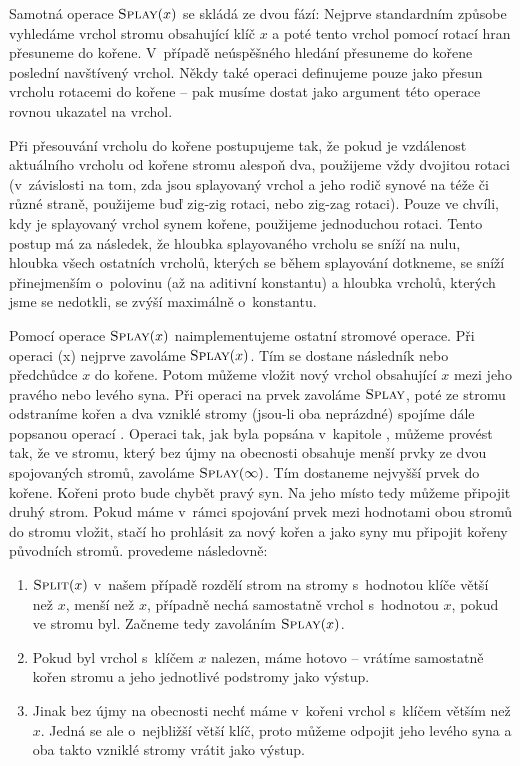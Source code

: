 Samotná operace $\ope{Splay}(x)$ se skládá ze dvou fází: Nejprve standardním způsobe
vyhledáme vrchol stromu obsahující klíč $x$ a poté tento vrchol pomocí rotací
hran přesuneme do kořene. V~případě neúspěšného hledání přesuneme do kořene poslední navštívený vrchol. Někdy také operaci  definujeme pouze jako přesun vrcholu rotacemi do kořene -- pak musíme dostat jako argument této operace rovnou ukazatel na vrchol.

Při přesouvání vrcholu do kořene postupujeme tak, že
pokud je vzdálenost aktuálního vrcholu od kořene stromu alespoň dva, použijeme
vždy dvojitou rotaci (v~závislosti na tom, zda jsou splayovaný vrchol a jeho
rodič synové na téže či různé straně, použijeme buď zig-zig rotaci, nebo zig-zag
rotaci). Pouze ve chvíli, kdy je splayovaný vrchol synem kořene, použijeme
jednoduchou rotaci. Tento postup má za následek, že hloubka splayovaného vrcholu se sníží na nulu, hloubka všech ostatních vrcholů, kterých se během splayování dotkneme, se sníží přinejmenším o~polovinu (až na aditivní konstantu) a hloubka vrcholů, kterých jsme se nedotkli, se zvýší maximálně o~konstantu.

Pomocí operace $\ope{Splay}(x)$ naimplementujeme ostatní stromové operace. Při operaci (x) nejprve zavoláme $\ope{Splay}(x)$. Tím se dostane následník nebo předchůdce $x$ do kořene. Potom můžeme vložit nový vrchol obsahující $x$ mezi jeho pravého nebo levého syna. Při operaci  na prvek zavoláme $\ope{Splay}$, poté ze stromu odstraníme kořen a dva vzniklé stromy (jsou-li oba neprázdné)  spojíme dále popsanou operací . Operaci  tak, jak byla popsána v~kapitole , můžeme provést tak, že ve stromu, který bez újmy na obecnosti obsahuje menší prvky ze dvou spojovaných stromů, zavoláme $\ope{Splay}(\infty)$. Tím dostaneme nejvyšší prvek do kořene. Kořeni proto bude chybět pravý syn. Na jeho místo tedy můžeme připojit druhý strom. Pokud máme v~rámci spojování prvek mezi hodnotami obou stromů do stromu vložit, stačí ho prohlásit za nový kořen a jako syny mu připojit kořeny původních stromů.  provedeme následovně:

\begin{enumerate}
\item $\ope{Split}(x)$ v~našem případě rozdělí strom na stromy s~hodnotou klíče větší než $x$, menší než $x$, případně nechá samostatně vrchol s~hodnotou $x$, pokud ve stromu byl. Začneme tedy zavoláním $\ope{Splay}(x)$.
\item Pokud byl vrchol s~klíčem $x$ nalezen, máme hotovo -- vrátíme samostatně kořen stromu a jeho jednotlivé podstromy jako výstup.
\item Jinak bez újmy na obecnosti nechť máme v~kořeni vrchol s~klíčem větším než $x$. Jedná se ale o~nejbližší větší klíč, proto můžeme odpojit jeho levého syna a oba takto vzniklé stromy vrátit jako výstup.
\end{enumerate}

